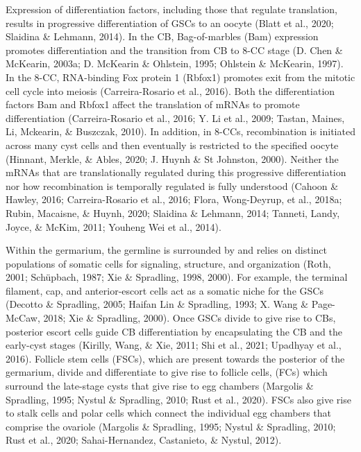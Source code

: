 \documentclass[12pt,oneside]{reedthesis}
\begin{document}
Expression of differentiation factors, including those that regulate
translation, results in progressive differentiation of GSCs to an oocyte
(Blatt et al., 2020; Slaidina \& Lehmann, 2014). In
the CB, Bag-of-marbles (Bam) expression promotes differentiation and the
transition from CB to 8-CC stage (D. Chen \& McKearin, 2003a; D. McKearin \& Ohlstein, 1995; Ohlstein \& McKearin, 1997). In the 8-CC, RNA-binding
Fox protein 1 (Rbfox1) promotes exit from the mitotic cell cycle into
meiosis (Carreira-Rosario et al., 2016). Both the differentiation factors
Bam and Rbfox1 affect the translation of mRNAs to promote
differentiation (Carreira-Rosario et al., 2016; Y. Li et al., 2009; Tastan, Maines, Li, Mckearin, \& Buszczak, 2010). In addition, in 8-CCs,
recombination is initiated across many cyst cells and then eventually is
restricted to the specified oocyte
(Hinnant, Merkle, \& Ables, 2020; J. Huynh \& St Johnston, 2000). Neither the mRNAs that are translationally
regulated during this progressive differentiation nor how recombination
is temporally regulated is fully understood
(Cahoon \& Hawley, 2016; Carreira-Rosario et al., 2016; Flora, Wong-Deyrup, et al., 2018a; Rubin, Macaisne, \& Huynh, 2020; Slaidina \& Lehmann, 2014; Tanneti, Landy, Joyce, \& McKim, 2011; Youheng Wei et al., 2014).

Within the germarium, the germline is surrounded by and relies on
distinct populations of somatic cells for signaling, structure, and
organization (Roth, 2001; Schüpbach, 1987; Xie \& Spradling, 1998, 2000). For example, the
terminal filament, cap, and anterior-escort cells act as a somatic niche
for the GSCs (Decotto \& Spradling, 2005; Haifan Lin \& Spradling, 1993; X. Wang \& Page-McCaw, 2018; Xie \& Spradling, 2000). Once GSCs divide to give rise to CBs, posterior escort
cells guide CB differentiation by encapsulating the CB and the
early-cyst stages (Kirilly, Wang, \& Xie, 2011; Shi et al., 2021; Upadhyay et al., 2016). Follicle stem cells
(FSCs), which are present towards the posterior of the germarium, divide
and differentiate to give rise to follicle cells, (FCs) which surround
the late-stage cysts that give rise to egg chambers (Margolis \& Spradling, 1995; Nystul \& Spradling, 2010; Rust et al., 2020). FSCs also give rise to stalk cells
and polar cells which connect the individual egg chambers that comprise
the ovariole (Margolis \& Spradling, 1995; Nystul \& Spradling, 2010; Rust et al., 2020; Sahai-Hernandez, Castanieto, \& Nystul, 2012).
\end{document}
